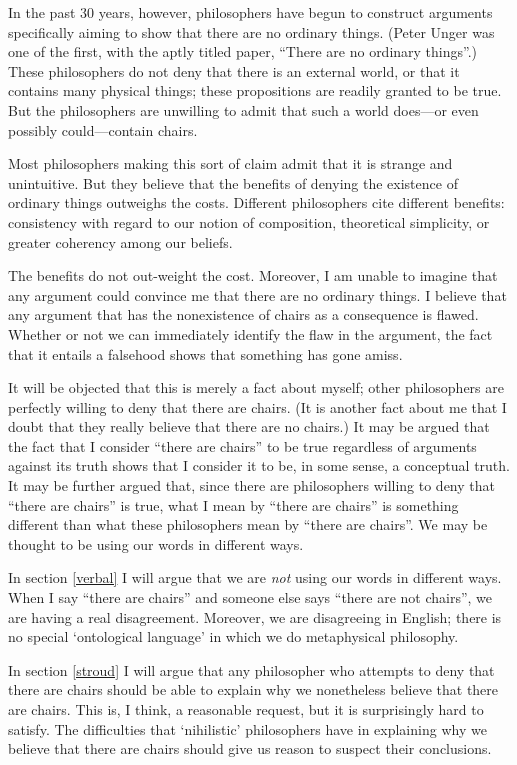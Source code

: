 \documentclass[11pt]{article}
\begin{document}
\begin{spacing}{1.5}
In the past 30 years, however, philosophers have begun to construct
arguments specifically aiming to show that there are no ordinary
things.  (Peter Unger was one of the first, with the aptly titled
paper, ``There are no ordinary things''.)  These philosophers do not
deny that there is an external world, or that it contains many
physical things; these propositions are readily granted to be true.
But the philosophers are unwilling to admit that such a world
does---or even possibly could---contain chairs.

Most philosophers making this sort of claim admit that it is strange
and unintuitive.  But they believe that the benefits of denying the
existence of ordinary things outweighs the costs.  Different
philosophers cite different benefits: consistency with regard to our
notion of composition, theoretical simplicity, or greater coherency
among our beliefs.  

The benefits do not out-weight the cost.  Moreover, I am unable to
imagine that any argument could convince me that there are no ordinary
things.  I believe that any argument that has the nonexistence of
chairs as a consequence is flawed.  Whether or not we can immediately
identify the flaw in the argument, the fact that it entails a
falsehood shows that something has gone amiss.

It will be objected that this is merely a fact about myself; other
philosophers are perfectly willing to deny that there are chairs.  (It
is another fact about me that I doubt that they really believe that
there are no chairs.)  It may be argued that the fact that I consider
``there are chairs'' to be true regardless of arguments against its
truth shows that I consider it to be, in some sense, a conceptual
truth.  It may be further argued that, since there are philosophers
willing to deny that ``there are chairs'' is true, what I mean by
``there are chairs'' is something different than what these
philosophers mean by ``there are chairs''.  We may be thought to be
using our words in different ways.

In section \ref{verbal} I will argue that we are {\em not} using our
words in different ways.  When I say ``there are chairs'' and someone
else says ``there are not chairs'', we are having a real disagreement.
Moreover, we are disagreeing in English; there is no special
`ontological language' in which we do metaphysical philosophy.

In section \ref{stroud} I will argue that any philosopher who attempts
to deny that there are chairs should be able to explain why we
nonetheless believe that there are chairs.  This is, I think, a
reasonable request, but it is surprisingly hard to satisfy.  The
difficulties that `nihilistic' philosophers have in explaining why we
believe that there are chairs should give us reason to suspect their
conclusions.


\end{spacing}
\end{document}
